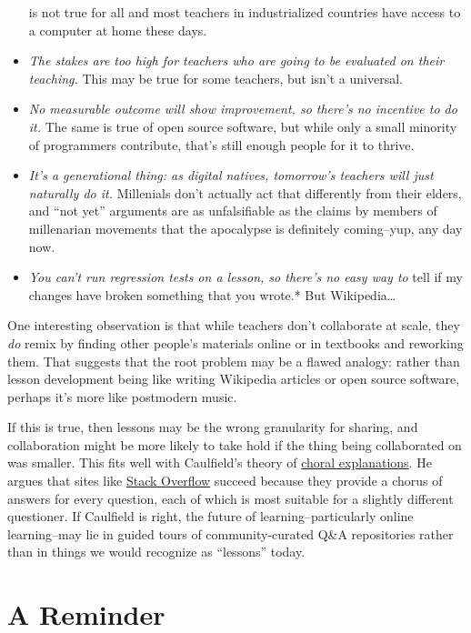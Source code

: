 \documentclass[10pt,statementpaper]{memoir}
\begin{document}
\begin{itemize}
  is not true for all and most teachers in industrialized countries have
  access to a computer at home these days.
\item
  \emph{The stakes are too high for teachers who are going to be
  evaluated on their teaching.} This may be true for some teachers, but
  isn't a universal.
\item
  \emph{No measurable outcome will show improvement, so there's no
  incentive to do it.} The same is true of open source software, but
  while only a small minority of programmers contribute, that's still
  enough people for it to thrive.
\item
  \emph{It's a generational thing: as digital natives, tomorrow's
  teachers will just naturally do it.} Millenials don't actually act
  that differently from their elders, and ``not yet'' arguments are as
  unfalsifiable as the claims by members of millenarian movements that
  the apocalypse is definitely coming--yup, any day now.
\item
  \emph{You can't run regression tests on a lesson, so there's no easy
  way to }tell if my changes have broken something that you wrote.* But
  Wikipedia\ldots{}
\end{itemize}

One interesting observation is that while teachers don't collaborate at
scale, they \emph{do} remix by finding other people's materials online
or in textbooks and reworking them. That suggests that the root problem
may be a flawed analogy: rather than lesson development being like
writing Wikipedia articles or open source software, perhaps it's more
like postmodern music.

If this is true, then lessons may be the wrong granularity for sharing,
and collaboration might be more likely to take hold if the thing being
collaborated on was smaller. This fits well with Caulfield's theory of
\href{https://hapgood.us/2016/05/13/choral-explanations/}{choral
explanations}. He argues that sites like
\href{https://stackoverflow.com/}{Stack Overflow} succeed because they
provide a chorus of answers for every question, each of which is most
suitable for a slightly different questioner. If Caulfield is right, the
future of learning--particularly online learning--may lie in guided
tours of community-curated Q\&A repositories rather than in things we
would recognize as ``lessons'' today.

\section{A Reminder}\label{a-reminder}
\end{document}
